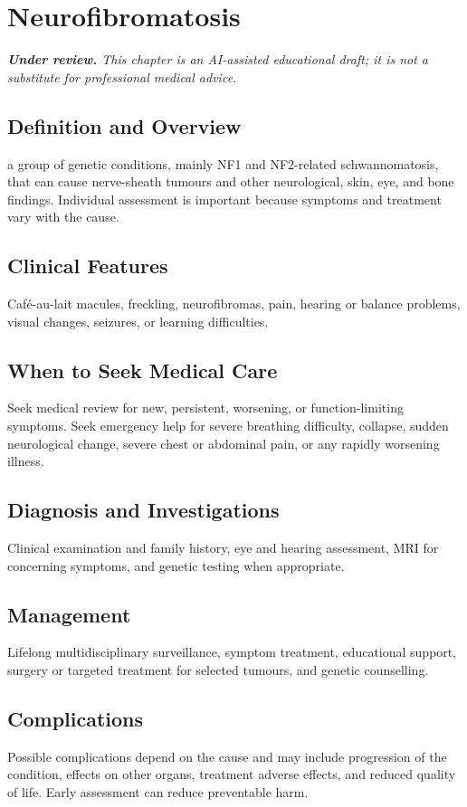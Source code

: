 \chapter{Neurofibromatosis}

\medskip
\noindent\textit{\textbf{Under review.} This chapter is an AI-assisted educational draft; it is not a substitute for professional medical advice.}

\section*{Definition and Overview}
a group of genetic conditions, mainly NF1 and NF2-related schwannomatosis, that can cause nerve-sheath tumours and other neurological, skin, eye, and bone findings. Individual assessment is important because symptoms and treatment vary with the cause.

\section*{Clinical Features}
Café-au-lait macules, freckling, neurofibromas, pain, hearing or balance problems, visual changes, seizures, or learning difficulties.

\section*{When to Seek Medical Care}
Seek medical review for new, persistent, worsening, or function-limiting symptoms. Seek emergency help for severe breathing difficulty, collapse, sudden neurological change, severe chest or abdominal pain, or any rapidly worsening illness.

\section*{Diagnosis and Investigations}
Clinical examination and family history, eye and hearing assessment, MRI for concerning symptoms, and genetic testing when appropriate.

\section*{Management}
Lifelong multidisciplinary surveillance, symptom treatment, educational support, surgery or targeted treatment for selected tumours, and genetic counselling.

\section*{Complications}
Possible complications depend on the cause and may include progression of the condition, effects on other organs, treatment adverse effects, and reduced quality of life. Early assessment can reduce preventable harm.

